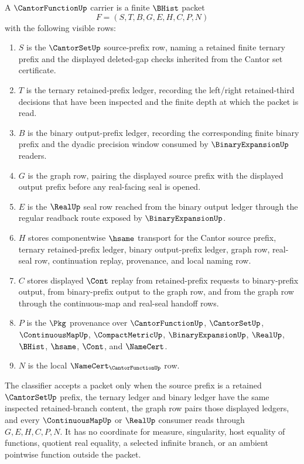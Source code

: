 \begin{definition}
\label{def:cantor-function-carrier}
A $\CantorFunctionUp$ carrier is a finite $\BHist$ packet
$$
F=(S,T,B,G,E,H,C,P,N)
$$
with the following visible rows:
\begin{enumerate}
\item $S$ is the $\CantorSetUp$ source-prefix row, naming a retained finite ternary prefix and the displayed deleted-gap checks inherited from the Cantor set certificate.
\item $T$ is the ternary retained-prefix ledger, recording the left/right retained-third decisions that have been inspected and the finite depth at which the packet is read.
\item $B$ is the binary output-prefix ledger, recording the corresponding finite binary prefix and the dyadic precision window consumed by $\BinaryExpansionUp$ readers.
\item $G$ is the graph row, pairing the displayed source prefix with the displayed output prefix before any real-facing seal is opened.
\item $E$ is the $\RealUp$ seal row reached from the binary output ledger through the regular readback route exposed by $\BinaryExpansionUp$.
\item $H$ stores componentwise $\hsame$ transport for the Cantor source prefix, ternary retained-prefix ledger, binary output-prefix ledger, graph row, real-seal row, continuation replay, provenance, and local naming row.
\item $C$ stores displayed $\Cont$ replay from retained-prefix requests to binary-prefix output, from binary-prefix output to the graph row, and from the graph row through the continuous-map and real-seal handoff rows.
\item $P$ is the $\Pkg$ provenance over $\CantorFunctionUp$, $\CantorSetUp$, $\ContinuousMapUp$, $\CompactMetricUp$, $\BinaryExpansionUp$, $\RealUp$, $\BHist$, $\hsame$, $\Cont$, and $\NameCert$.
\item $N$ is the local $\NameCert_{\CantorFunctionUp}$ row.
\end{enumerate}
The classifier accepts a packet only when the source prefix is a retained $\CantorSetUp$ prefix, the ternary ledger and binary ledger have the same inspected retained-branch content, the graph row pairs those displayed ledgers, and every $\ContinuousMapUp$ or $\RealUp$ consumer reads through $G,E,H,C,P,N$. It has no coordinate for measure, singularity, host equality of functions, quotient real equality, a selected infinite branch, or an ambient pointwise function outside the packet.
\end{definition}

